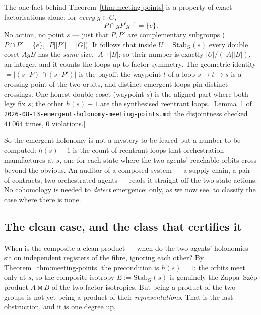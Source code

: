 \documentclass[11pt,a4paper]{book}
\theoremstyle{plain}
\theoremstyle{definition}
\theoremstyle{remark}
\newcommand{\prov}[1]{\hfill\textsf{\footnotesize[#1]}}
\begin{document}
\begin{teachbox}
The one fact behind Theorem~\ref{thm:meeting-points} is a property of exact
factorisations alone: for \emph{every} $g\in G$,
\[
   P\cap gP'g^{-1}=\{e\}.
\]
No action, no point $s$ --- just that $P,P'$ are complementary subgroups
($P\cap P'=\{e\}$, $|P||P'|=|G|$). It follows that inside $U=\mathrm{Stab}_{G}(s)$ every
double coset $AgB$ has the \emph{same} size, $|A|\cdot|B|$; so their number is exactly
$|U|/(|A||B|)$, an integer, and it counts the loops-up-to-factor-symmetry. The geometric
identity $=|(s\cdot P)\cap(s\cdot P')|$ is the payoff: the waypoint $t$ of a loop
$s\to t\to s$ is a crossing point of the two orbits, and distinct emergent loops pin
distinct crossings. One honest double coset (waypoint $s$) is the aligned part where both
legs fix $s$; the other $h(s)-1$ are the synthesised reentrant loops.
\prov{Lemma~1 of \texttt{2026-08-13-emergent-holonomy-meeting-points.md}; the
disjointness checked $41\,064$ times, $0$ violations.}
\end{teachbox}

So the emergent holonomy is not a mystery to be feared but a number to be computed:
$h(s)-1$ is the count of reentrant loops that orchestration manufactures at $s$, one for
each state where the two agents' reachable orbits cross beyond the obvious. An auditor
of a composed system --- a supply chain, a pair of contracts, two orchestrated agents ---
reads it straight off the two state actions. No cohomology is needed to \emph{detect}
emergence; only, as we now see, to classify the case where there is none.

\subsection*{The clean case, and the class that certifies it}

When is the composite a clean product --- when do the two agents' holonomies sit on
independent registers of the fibre, ignoring each other? By
Theorem~\ref{thm:meeting-points} the precondition is $h(s)=1$: the orbits meet only at
$s$, so the composite isotropy $E:=\mathrm{Stab}_{G}(s)$ is genuinely the Zappa--Sz\'ep
product $A\bowtie B$ of the two factor isotropies. But being a product of the two groups
is not yet being a product of their \emph{representations}. That is the last obstruction,
and it is one degree up.
\end{document}
